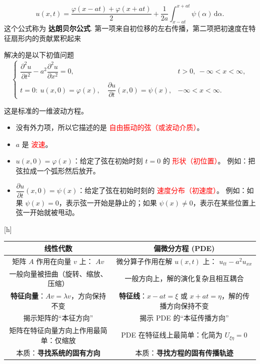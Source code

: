 \begin{definition}[达朗贝尔公式]
  
  \begin{equation}
u(x,t) = \frac{\varphi(x - at) + \varphi(x + at)}{2}
+ \frac{1}{2a} \int_{x - at}^{x + at} \psi(\alpha)\, \mathrm{d}\alpha.
\tag{2.19}
\end{equation}
这个公式称为 \textbf{达朗贝尔公式}.
第一项来自初位移的左右传播，第二项把初速度在特征扇形内的贡献累积起来
\end{definition}
解决的是以下初值问题
\begin{equation}
\begin{cases}
\dfrac{\partial^2 u}{\partial t^2} - a^2 \dfrac{\partial^2 u}{\partial x^2} = 0, 
& t > 0,\ -\infty < x < \infty, \\[1.2ex]
t = 0:\ u(x,0) = \varphi(x),\quad \dfrac{\partial u}{\partial t}(x,0) = \psi(x), 
& -\infty < x < \infty.
\end{cases}
\tag{2.7--2.8}
\end{equation}
\begin{remark}[物理解释]
这是标准的一维波动方程。
\begin{itemize}
  \item 没有外力项，所以它描述的是 \textcolor{red}{自由振动的弦（或波动介质）}。
  \item $a$ 是 \textcolor{red}{波速}。
  \item $u(x,0) = \varphi(x)$：给定了弦在初始时刻 $t=0$ 的 \textcolor{red}{形状（初位置）}。  
  例如：把弦拉成一个弧形然后放开。
  \item $\dfrac{\partial u}{\partial t}(x,0) = \psi(x)$：给定了弦在初始时刻的 \textcolor{red}{速度分布（初速度）}。  
  例如：如果 $\psi(x)=0$，表示弦一开始是静止的；如果 $\psi(x)\neq 0$，表示在某些位置上弦一开始就被甩动。
\end{itemize}
\end{remark}
\begin{center}[h]
\centering
\renewcommand{\arraystretch}{1.4}
\begin{tabular}{|c|c|}
\hline
\textbf{线性代数} & \textbf{偏微分方程 (PDE)} \\
\hline
矩阵 $A$ 作用在向量 $v$ 上： $Av$ & 微分算子作用在解 $u(x,t)$ 上： $u_{tt} - a^2 u_{xx}$ \\
\hline
一般向量被扭曲（旋转、缩放、压缩） & 一般方向上，解的演化复杂且相互耦合 \\
\hline
\textbf{特征向量}：$Av = \lambda v$，方向保持不变 & \textbf{特征线}：$x - at = \xi$ 或 $x + at = \eta$，解的传播方向保持不变 \\
\hline
揭示矩阵的“本征方向” & 揭示 PDE 的“本征传播方向” \\
\hline
矩阵在特征向量方向上作用最简单：仅缩放 & PDE 在特征线上最简单：化简为 $U_{\xi \eta} = 0$ \\
\hline
本质：\textbf{寻找系统的固有方向} & 本质：\textbf{寻找方程的固有传播轨迹} \\
\hline
\end{tabular}
\end{center}

